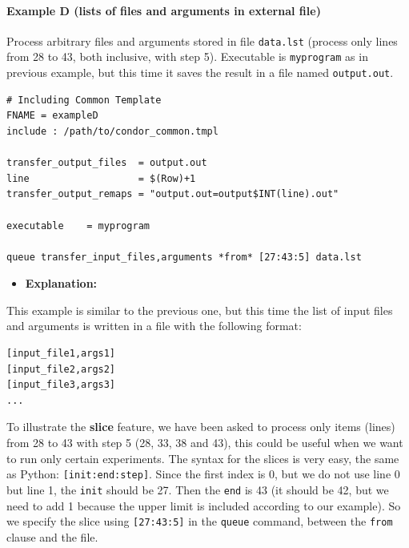 \documentclass[a4paper,10pt]{article}
\begin{document}
\paragraph{Example D (lists of files and arguments in external file)}
\label{sec:orgc741967}

Process arbitrary files and arguments stored in file \texttt{data.lst} (process only
 lines from 28 to 43, both inclusive, with step 5). Executable is \texttt{myprogram} as
 in previous example, but this time it saves the result in a file named
 \texttt{output.out}. 

\begin{verbatim}
# Including Common Template
FNAME = exampleD
include : /path/to/condor_common.tmpl

transfer_output_files  = output.out
line                   = $(Row)+1
transfer_output_remaps = "output.out=output$INT(line).out"

executable    = myprogram

queue transfer_input_files,arguments *from* [27:43:5] data.lst
\end{verbatim}

\begin{itemize}
\item \textbf{Explanation:}
\end{itemize}

This example is similar to the previous one, but this time the list of input
files and arguments is written in a file with the following format:

\begin{verbatim}
[input_file1,args1]
[input_file2,args2]
[input_file3,args3]
...
\end{verbatim}

To illustrate the \textbf{slice} feature, we have been asked to process only items
(lines) from 28 to 43 with step 5 (28, 33, 38 and 43), this could be useful when
we want to run only certain experiments. The syntax for the slices is very easy,
the same as Python: \texttt{[init:end:step]}. Since the first index is 0, but we do not
use line 0 but line 1, the \texttt{init} should be 27. Then the \texttt{end} is 43 (it should
be 42, but we need to add 1 because the upper limit is included according to our
example). So we specify the slice using \texttt{[27:43:5]} in the \texttt{queue} command,
between the \texttt{from} clause and the file.
\end{document}

